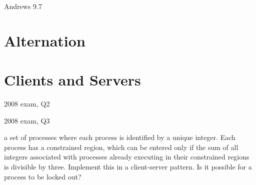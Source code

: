 \documentclass[fleqn,12pt]{article}
\begin{document}





  Andrews 9.7




\section{Alternation}

 














\section{Clients and Servers} %






 2008 exam, Q2

 2008 exam, Q3

 a set of processes where each process is identified by
a unique integer. Each process has a constrained region, which can be entered
only if the sum of all integers associated with processes already executing in
their constrained regions is divisible by three.  Implement this in a
client-server pattern.  Is it possible for a process to be locked out?


\end{document}
